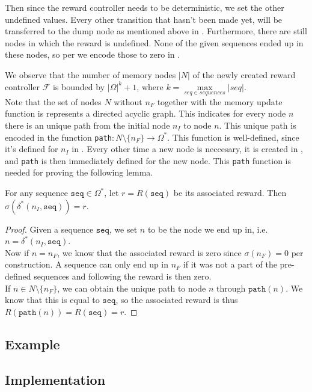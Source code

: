 Then since the reward controller needs to be deterministic, we set the other undefined values. Every other transition that hasn't been made yet, will be transferred to the dump node as mentioned above in . Furthermore, there are still nodes in which the reward is undefined. None of the given sequences ended up in these nodes, so per  we encode those to zero in .

We observe that the number of memory nodes $|N|$ of the newly created reward controller $\mathcal{F}$ is bounded by $|\Omega|^k + 1$, where $k=\max\limits_{seq\in sequences} |seq|$.\\

Note that the set of nodes $N$ without $n_F$ together with the memory update function is represents a directed acyclic graph. This indicates for every node $n$ there is an unique path from the initial node $n_I$ to node $n$. This unique path is encoded in the function \texttt{path}$:N\setminus\{n_F\}\to\Omega^*$. This function is well-defined, since it's defined for $n_I$ in . Every other time a new node is neccesary, it is created in , and \texttt{path} is then immediately defined for the new node. This \texttt{path} function is needed for proving the following lemma. 


\begin{lemma}
For any sequence $\texttt{seq}\in\Omega^*$, let $r=R(\texttt{seq})$ be its associated reward. Then $\sigma(\delta^*(n_I,\texttt{seq}))=r$.
\begin{proof}
Given a sequence $\texttt{seq}$, we set $n$ to be the node we end up in, i.e. $n = \delta^*(n_I,\texttt{seq})$. \\
Now if $n=n_F$, we know that the associated reward is zero since $\sigma(n_F)=0$ per construction. A sequence can only end up in $n_F$ if it was not a part of the pre-defined sequences and following  the reward is then zero. \\
If $n\in N\setminus \{n_F\}$, we can obtain the unique path to node $n$ through $\texttt{path}(n)$. We know that this is equal to $\texttt{seq}$, so the associated reward is thus $R(\texttt{path}(n))=R(\texttt{seq})=r$.
\end{proof}
\label{lem:proof_seq}
\end{lemma}

\subsection*{Example}


\subsection*{Implementation}
